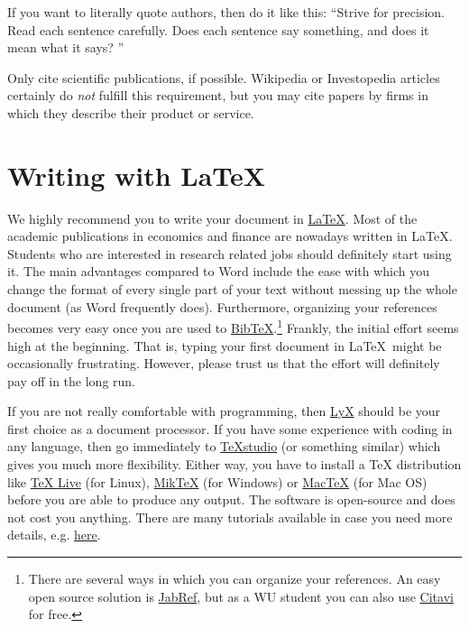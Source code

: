 \documentclass[a4paper, 12pt]{article}
\begin{document}
	If you want to literally quote authors, then do it like this: ``Strive for precision. Read each sentence carefully. Does each sentence say something, and does it mean what it says? \citep[][p. 5]{Cochrane.2005}''
		
	Only cite scientific publications, if possible. Wikipedia or Investopedia articles certainly do \textit{not} fulfill this requirement, but you may cite papers by firms in which they describe their product or service.
		
	\section{Writing with \LaTeX}\label{sec:latex}
	
	We highly recommend you to write your document in \href{https://en.wikipedia.org/wiki/LaTeX}{\LaTeX}. Most of the academic publications in economics and finance are nowadays written in \LaTeX. Students who are interested in research related jobs should definitely start using it. The main advantages compared to Word include the ease with which you change the format of every single part of your text without messing up the whole document (as Word frequently does). Furthermore, organizing your references becomes very easy once you are used to \href{https://de.wikipedia.org/wiki/BibTeX}{BibTeX}.\footnote{There are several ways in which you can organize your references. An easy open source solution is \href{http://www.jabref.org/}{JabRef}, but as a WU student you can also use \href{https://learn.wu.ac.at/bibliothek/literaturverwaltung}{Citavi} for free.} Frankly, the initial effort seems high at the beginning. That is, typing your first document in \LaTeX\ might be occasionally frustrating. However, please trust us that the effort will definitely pay off in the long run.
	
	If you are not really comfortable with programming, then \href{https://www.lyx.org/}{LyX} should be your first choice as a document processor. If you have some experience with coding in any language, then go immediately to \href{http://www.texstudio.org/}{TeXstudio} (or something similar) which gives you much more flexibility. Either way, you have to install a TeX distribution like \href{https://en.wikipedia.org/wiki/TeX_Live}{TeX Live} (for Linux), \href{ttp://miktex.org/}{MikTeX} (for Windows) or \href{https://tug.org/mactex/}{MacTeX} (for Mac OS) before you are able to produce any output. The software is open-source and does not cost you anything. There are many tutorials available in case you need more details, e.g. \href{http://math65740.blogspot.co.at/2015/06/installing-miktex-and-texstudio-on.html}{here}. 
	
\end{document}
